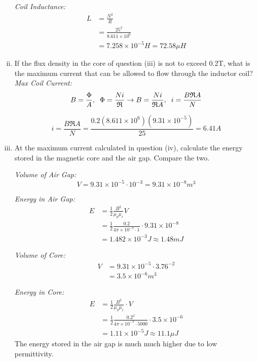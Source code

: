 \documentclass[a4paper,11pt]{article}
\begin{document}
\begin{enumerate}[i.]
          \textit{Coil Inductance:}
          \begin{align*}
            L &= \frac{N^2}{R}\\ 
            &=\frac{25^2}{8.611\times 10^6}\\ 
            &= 7.258\times 10^{-5}H = 72.58\mu H
        \end{align*}

    \item If the flux density in the core of question (iii) is not to exceed 0.2T, what is the maximum current that can be allowed to flow through the inductor coil?
          \textit{Max Coil Current:}
          $$B = \frac{\Phi}{A}, \hspace{2mm} \Phi = \frac{Ni}{\mathfrak{R}} \rightarrow B = \frac{Ni}{\mathfrak{R}A}, \hspace{2mm}i = \frac{B\mathfrak{R}A}{N}$$

          $$i = \frac{B\mathfrak{R}A}{N} = \frac{0.2(8.611\times10^6)(9.31\times 10^{-5})}{25} = 6.41A$$

    \newpage
    \item At the maximum current calculated in question (iv), calculate the energy stored in the magnetic core and the air gap. Compare the two.

          \textit{Volume of Air Gap:}
          $$V = 9.31\times10^{-5}\cdot 10^{-3} = 9.31\times10^{-8}m^3$$

          \textit{Energy in Air Gap:}
          \begin{align*}  
            E &= \frac{1}{2}\frac{B^2}{\mu_0 \mu_r}V\\ 
            &= \frac{1}{2}\frac{0.2}{4\pi\times10^{-7}\cdot 1}\cdot 9.31\times10^{-8}\\ 
            &= 1.482\times 10^{-3}J \approx 1.48m J
        \end{align*}

          \textit{Volume of Core:}
          \begin{align*}
            V &= 9.31\times10^{-5}\cdot 3.76^{-2}\\
             &= 3.5\times10^{-6}m^3
          \end{align*}

          \textit{Energy in Core:}
          \begin{align*}
            E &= \frac{1}{2}\frac{B^2}{\mu_0 \mu_r}\cdot V\\ 
            &= \frac{1}{2}\frac{0.2^2}{4\pi\times10^{-7}\cdot 5000}\cdot 3.5\times10^{-6}\\ 
            &= 1.11\times 10^{-5}J \approx 11.1\mu J
          \end{align*}
        The energy stored in the air gap is much much higher due to low permittivity.
\end{enumerate}
\end{document}
